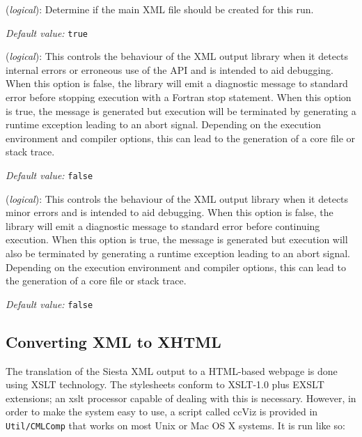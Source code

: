 \documentclass[11pt]{article}
\begin{document}
\begin{description}
\itemsep 10pt
\parsep 0pt


\item[{\bf XML.Write}] ({\it logical}): 
Determine if the main XML file should be created for this run.

{\it Default value:} {\tt true}

\item[{\bf XML.AbortOnErrors}] ({\it logical}): 
This controls the behaviour of the XML output library when it detects 
internal errors or erroneous use of the API and is intended to aid debugging.
When this option is false, the library will emit a diagnostic message to 
standard error before stopping execution with a Fortran stop statement.
When this option is true, the message is generated but execution will be 
terminated by generating a runtime exception leading to an abort signal. 
Depending on the execution environment and compiler options, this can lead 
to the generation of a core file or stack trace. 

{\it Default value:} {\tt false}

\item[{\bf XML.AbortOnWarnings}] ({\it logical}): 
This controls the behaviour of the XML output library when it detects 
minor errors and is intended to aid debugging.  When this option is false,
the library will emit a diagnostic message to standard error before 
continuing execution. When this option is true, the message is generated 
but execution will also be terminated by generating a runtime exception 
leading to an abort signal. Depending on the execution environment and 
compiler options, this can lead to the generation of a core file or 
stack trace.

{\it Default value:} {\tt false}

\end{description}

\subsection{Converting XML to XHTML}

The translation of the {\sc Siesta} XML output to a HTML-based webpage is
done using XSLT technology. The stylesheets conform to XSLT-1.0 plus
EXSLT extensions; an xslt processor capable of dealing with this is
necessary. However, in order to make the system easy to use, a script
called ccViz is provided in \texttt{Util/CMLComp} that works on most Unix or
Mac OS X systems. It is run like so:
\end{document}
